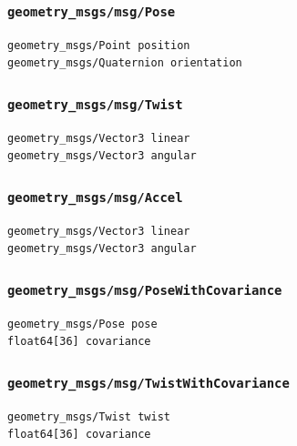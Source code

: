 \documentclass[
]{article}
\begin{document}
\subsubsection{\texorpdfstring{\texttt{geometry\_msgs/msg/Pose}}{geometry\_msgs/msg/Pose}}\label{geometry_msgsmsgpose}

\begin{verbatim}
geometry_msgs/Point position
geometry_msgs/Quaternion orientation
\end{verbatim}

\subsubsection{\texorpdfstring{\texttt{geometry\_msgs/msg/Twist}}{geometry\_msgs/msg/Twist}}\label{geometry_msgsmsgtwist}

\begin{verbatim}
geometry_msgs/Vector3 linear
geometry_msgs/Vector3 angular
\end{verbatim}

\subsubsection{\texorpdfstring{\texttt{geometry\_msgs/msg/Accel}}{geometry\_msgs/msg/Accel}}\label{geometry_msgsmsgaccel}

\begin{verbatim}
geometry_msgs/Vector3 linear
geometry_msgs/Vector3 angular
\end{verbatim}

\subsubsection{\texorpdfstring{\texttt{geometry\_msgs/msg/PoseWithCovariance}}{geometry\_msgs/msg/PoseWithCovariance}}\label{geometry_msgsmsgposewithcovariance}

\begin{verbatim}
geometry_msgs/Pose pose
float64[36] covariance
\end{verbatim}

\subsubsection{\texorpdfstring{\texttt{geometry\_msgs/msg/TwistWithCovariance}}{geometry\_msgs/msg/TwistWithCovariance}}\label{geometry_msgsmsgtwistwithcovariance}

\begin{verbatim}
geometry_msgs/Twist twist
float64[36] covariance
\end{verbatim}
\end{document}
